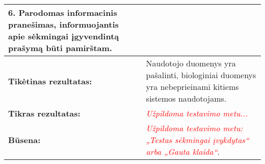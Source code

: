 \documentclass[12pt]{article}
\begin{document}
\begin{table}[htb!]
\begin{tabular}{|m{6cm}|m{11cm}|}
{{            \textbf{6.} {Parodomas informacinis pranešimas, informuojantis apie
            sėkmingai įgyvendintą prašymą būti pamirštam.}
        }} \\
        \hline
        \raggedleft \textbf{\cellcolor{deepchampagne}Tikėtinas rezultatas:}
        & Naudotojo duomenys yra pašalinti, biologiniai duomenys yra
        nebeprieinami kitiems sistemos naudotojams. \\
        \hline
        \raggedleft \textbf{\cellcolor{deepchampagne}Tikras rezultatas:}
        & \textcolor{red}{\emph{Užpildoma testavimo metu...}} \\
        \hline
        \raggedleft \textbf{\cellcolor{deepchampagne}Būsena:}
        & \textcolor{red}{\emph{Užpildoma testavimo metu: „Testas sėkmingai
        įvykdytas“ arba „Gauta klaida“}}. \\
        \hline
    \end{tabular}
    \label{table:TS_4}
\end{table}

\newpage
\end{document}
